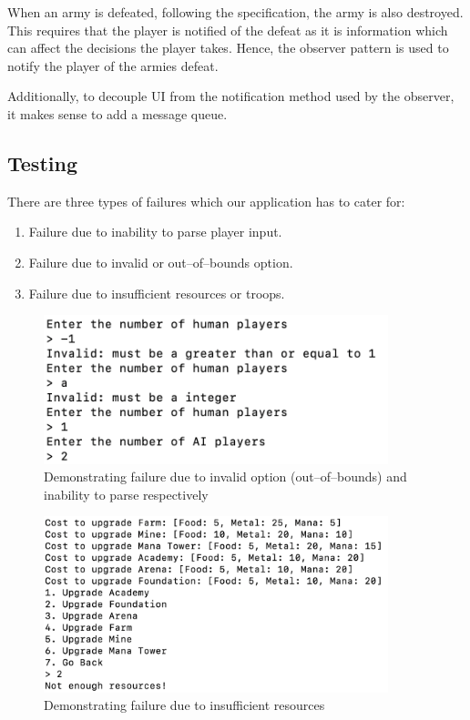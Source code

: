 \documentclass[12pt]{article}
\begin{document}
When an army is defeated, following the specification, the army
is also destroyed. This requires that the player is notified of
the defeat as it is information which can affect the decisions
the player takes. Hence, the observer pattern is used to notify
the player of the armies defeat.

Additionally, to decouple UI from the notification method used
by the observer, it makes sense to add a message queue.

\subsection{Testing}

There are three types of failures which our application has
to cater for:

\begin{enumerate}
    \item Failure due to inability to parse player input.
    \item Failure due to invalid or out--of--bounds option.
    \item Failure due to insufficient resources or troops.
\end{enumerate}

\begin{figure}[H]
    \centering
    \includegraphics[width=10cm]{./images/invalid-user-input-village-war-game.png}
    \caption{Demonstrating failure due to invalid option
    (out--of--bounds) and inability to parse respectively}
\end{figure}

\begin{figure}[H]
    \centering
    \includegraphics[width=10cm]{./images/not-enough-resources-village-war-game.png}
    \caption{Demonstrating failure due to insufficient
    resources}
\end{figure}
\end{document}
